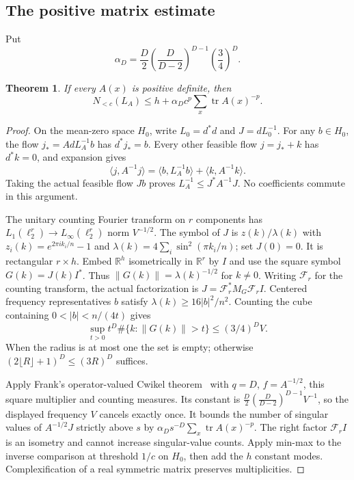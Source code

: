 \documentclass[11pt]{article}
\newcommand{\R}{\mathbb R}
\newtheorem{matrixTheorem}[theorem]{Theorem}
\providecommand{\tr}{\operatorname{tr}}
\providecommand{\Nlow}{N_{<c}}
\begin{document}
\subsection{The positive matrix estimate}
Put
\[
 \alpha_D=\frac D2\left(\frac D{D-2}\right)^{D-1}
                 \left(\frac34\right)^D.
\]
\begin{matrixTheorem}\label{mx:thm:positive}
If every $A(x)$ is positive definite, then
\begin{equation}\label{mx:eq:positive}
 \Nlow(L_A)\leq h+\alpha_D c^p\sum_x\tr A(x)^{-p}.
\end{equation}
\end{matrixTheorem}
\begin{proof}
On the mean-zero space $H_0$, write $L_0=d^*d$ and $J=dL_0^{-1}$.
For any $b\in H_0$, the flow $j_*=A dL_A^{-1}b$ has $d^*j_*=b$.
Every other feasible flow $j=j_*+k$ has $d^*k=0$, and expansion gives
\[
 \langle j,A^{-1}j\rangle
 =\langle b,L_A^{-1}b\rangle+\langle k,A^{-1}k\rangle.
\]
Taking the actual feasible flow $Jb$ proves
$L_A^{-1}\leq J^*A^{-1}J$. No coefficients commute in this argument.

The unitary counting Fourier transform on $r$ components has
$L_1(\ell_2^r)\to L_\infty(\ell_2^r)$ norm $V^{-1/2}$. The symbol of $J$
is $z(k)/\lambda(k)$ with
$z_i(k)=e^{2\pi i k_i/n}-1$ and
$\lambda(k)=4\sum_i\sin^2(\pi k_i/n)$; set $J(0)=0$.
It is rectangular $r\times h$. Embed $\R^h$ isometrically in $\R^r$ by $I$
and use the square symbol $G(k)=J(k)I^*$. Thus $\|G(k)\|=\lambda(k)^{-1/2}$
for $k\ne0$. Writing $\mathcal F_r$ for the counting transform, the actual
factorization is $J=\mathcal F_r^*M_G\mathcal F_r I$.
Centered frequency representatives $b$ satisfy
$\lambda(k)\geq16|b|^2/n^2$. Counting the cube containing
$0<|b|<n/(4t)$ gives
\[
 \sup_{t>0}t^D\#\{k:\|G(k)\|>t\}\leq(3/4)^D V.
\]
When the radius is at most one the set is empty; otherwise
$(2\lfloor R\rfloor+1)^D\leq(3R)^D$ suffices.

Apply Frank's operator-valued Cwikel theorem~\cite[Theorem 3.1]{mx:Frank}
with $q=D$, $f=A^{-1/2}$, this square multiplier and counting measures.
Its constant is $\frac D2(\frac D{D-2})^{D-1}V^{-1}$, so the displayed
frequency $V$ cancels exactly once. It bounds the number of singular values
of $A^{-1/2}J$ strictly above $s$ by
$\alpha_Ds^{-D}\sum_x\tr A(x)^{-p}$. The right factor $\mathcal F_r I$ is an isometry
and cannot increase singular-value counts. Apply min-max to the inverse
comparison at threshold $1/c$ on $H_0$, then add the $h$ constant modes.
Complexification of a real symmetric matrix preserves multiplicities.
\end{proof}
\end{document}
